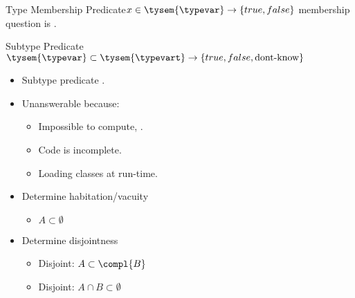 


\begin{frame}{Type Membership Predicate}{$x \in \tysem{\typevar} \to \{true, false\}$}
   membership question is .

  \usebox\membershipbox
\end{frame}



\begin{frame}{Subtype Predicate}{$\tysem{\typevar}\subset\tysem{\typevart} \to \{true,false,\text{dont-know}\}$}
  \begin{itemize}
    
  \item   {} Subtype predicate .
    
    \usebox\subtypebox
    
  \item Unanswerable because:
    \begin{itemize}
    \item Impossible to compute, \eg {}.
    \item Code is incomplete.
    \item Loading classes at run-time.
    \end{itemize}
    
  \item Determine habitation/vacuity
    \begin{itemize}
    \item $A \subset \emptyset$
    \end{itemize}

  \item Determine disjointness
    \begin{itemize}
    \item Disjoint:  $A \subset \compl{B}$
    \item Disjoint: $A\cap B \subset \emptyset$
    \end{itemize}
  \end{itemize}
  
\end{frame}

